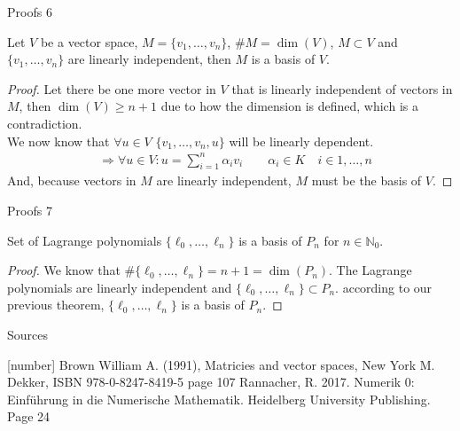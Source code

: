 \documentclass[8pt]{beamer}
\begin{document}
		\begin{frame}{Proofs 6}
			\begin{theorem}
				Let $V$ be a vector space, $M = \{v_1, \ldots, v_n\}$, $\# M = \dim(V)$, $M \subset V$ and $\{v_1, \ldots, v_n\}$ are linearly independent, then $M$ is a basis of $V$.
			\end{theorem}
			\begin{proof}
				Let there be one more vector in $V$ that is linearly independent of vectors in $M$, then $\dim(V) \geq n+1$ due to how the dimension is defined, which is a contradiction.\\ 
				We now know that $\forall u \in V$ $\{v_1, \ldots, v_n, u\}$ will be linearly dependent.
				\begin{align*}
					&\Rightarrow \forall u \in V: u = \sum_{i = 1}^{n}\alpha_i v_i \qquad \alpha_i \in K\quad i \in 1, \ldots, n
				\end{align*}
				And, because vectors in $M$ are linearly independent, $M$ must be the basis of $V$.
			\end{proof}
		\end{frame}
											
		\begin{frame}{Proofs 7}
			\begin{theorem}
				Set of Lagrange polynomials $\{\ell_0,\ldots, \ell_n\}$ is a basis of $P_n$ for $n \in \mathbb{N}_0$.
			\end{theorem}
			\begin{proof}
				We know that $\#\{\ell_0,\ldots, \ell_n\} = n+1 = \dim(P_n)$. The Lagrange polynomials are linearly independent and $\{\ell_0,\ldots, \ell_n\} \subset P_n$. according to our previous theorem, $\{\ell_0,\ldots, \ell_n\}$ is a basis of $P_n$.
			\end{proof}
		\end{frame}
		\begin{frame}{Sources}
			\begin{thebibliography}{9}
				[number]
				Brown William A. (1991), Matricies and vector spaces, New York M. Dekker, ISBN 978-0-8247-8419-5 page 107
				Rannacher, R. 2017. Numerik 0: Einführung in die Numerische Mathematik. Heidelberg University Publishing. Page 24
			\end{thebibliography}
		\end{frame}
													
\end{document}

